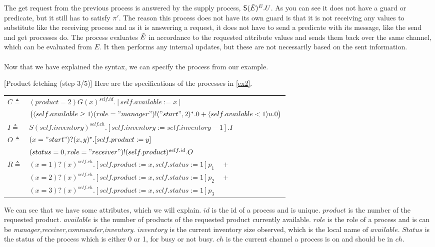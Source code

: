 The get request from the previous process is answered by the supply process, $\mathsf{S}(\Tilde{E})^{E}.U$. As you can see it does not have a guard or predicate, but it still has to satisfy $\pi '$. The reason this process does not have its own guard is that it is not receiving any values to substitute like the receiving process and as it is answering a request, it does not have to send a predicate with its message, like the send and get processes do. The process evaluates $\Tilde{E}$ in accordance to the requested attribute values and sends them back over the same channel, which can be evaluated from $E$. It then performs any internal updates, but these are not necessarily based on the sent information.\\
\\
Now that we have explained the syntax, we can specify the process from our example.
\begin{example}\label{ex3}[Product fetching (step 3/5)] 
    Here are the specifications of the processes in \ref{ex2}.\\
    \begin{table}[H]
    \centering
    \begin{tabular}{l l} 
    $C\triangleq$&$(product=2)G(x)^{self.id}.[self.available := x]$\\
    &$\bigl( \langle self.available \geq 1 \rangle (role="manager")!("start", 2)^*.0+ \langle self.available < 1 \rangle u.0 \bigr)$\\
    $I\triangleq$&$ S(self.inventory)^{self.ch}.[self.inventory:=self.inventory-1].I$\\
    $O\triangleq $&$ (x="start")?(x,y)^*.[self.product:=y]$\\
    & $(status=0,role="receiver")!(self.product)^{self.id}.O$\\
    $R\triangleq $&$ (x=1)?(x)^{self.ch}.[self.product:=x, self.status:=1]p_1\quad + $\\
    &$(x=2)?(x)^{self.ch}.[self.product:=x, self.status:=1]p_2\quad +$ \\
    &$(x=3)?(x)^{self.ch}.[self.product:=x, self.status:=1]p_3$\\
    \end{tabular}
    \label{Syntax}
    \end{table}
\end{example}
We can see that we have some attributes, which we will explain. $id$ is the id of a process and is unique. $product$ is the number of the requested product. $available$ is the number of products of the requested product currently available. $role$ is the role of a process and is can be \textit{manager,receiver,commander,inventory}. $inventory$ is the current inventory size observed, which is the local name of $available$. $Status$ is the status of the process which is either 0 or 1, for busy or not busy. $ch$ is the current channel a process is on and should be in $ch$.


